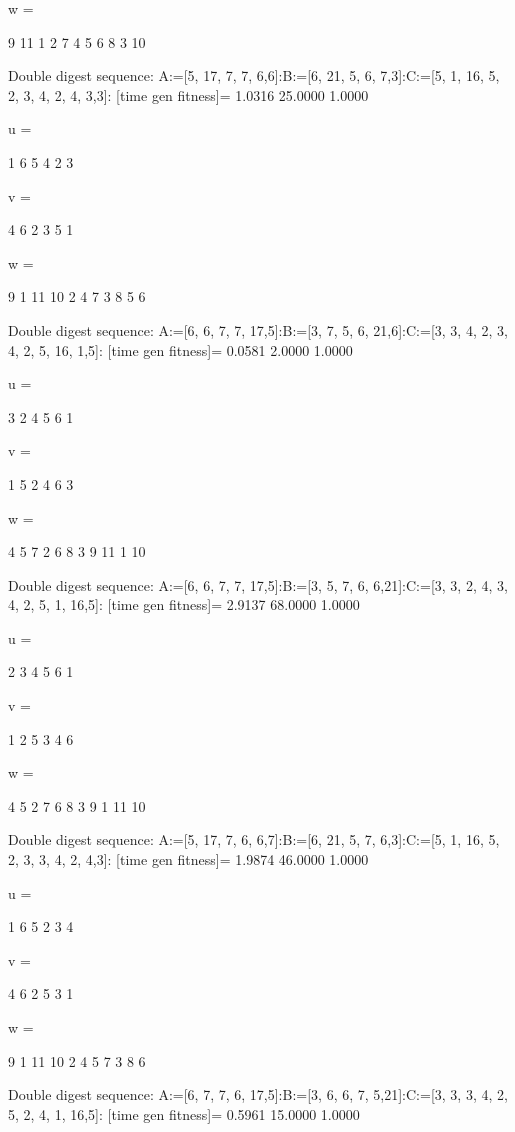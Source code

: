 w =

     9    11     1     2     7     4     5     6     8     3    10

Double digest sequence:
A:=[5, 17, 7, 7, 6,6]:B:=[6, 21, 5, 6, 7,3]:C:=[5, 1, 16, 5, 2, 3, 4, 2, 4, 3,3]:
[time gen fitness]=
    1.0316   25.0000    1.0000


u =

     1     6     5     4     2     3


v =

     4     6     2     3     5     1


w =

     9     1    11    10     2     4     7     3     8     5     6

Double digest sequence:
A:=[6, 6, 7, 7, 17,5]:B:=[3, 7, 5, 6, 21,6]:C:=[3, 3, 4, 2, 3, 4, 2, 5, 16, 1,5]:
[time gen fitness]=
    0.0581    2.0000    1.0000


u =

     3     2     4     5     6     1


v =

     1     5     2     4     6     3


w =

     4     5     7     2     6     8     3     9    11     1    10

Double digest sequence:
A:=[6, 6, 7, 7, 17,5]:B:=[3, 5, 7, 6, 6,21]:C:=[3, 3, 2, 4, 3, 4, 2, 5, 1, 16,5]:
[time gen fitness]=
    2.9137   68.0000    1.0000


u =

     2     3     4     5     6     1


v =

     1     2     5     3     4     6


w =

     4     5     2     7     6     8     3     9     1    11    10

Double digest sequence:
A:=[5, 17, 7, 6, 6,7]:B:=[6, 21, 5, 7, 6,3]:C:=[5, 1, 16, 5, 2, 3, 3, 4, 2, 4,3]:
[time gen fitness]=
    1.9874   46.0000    1.0000


u =

     1     6     5     2     3     4


v =

     4     6     2     5     3     1


w =

     9     1    11    10     2     4     5     7     3     8     6

Double digest sequence:
A:=[6, 7, 7, 6, 17,5]:B:=[3, 6, 6, 7, 5,21]:C:=[3, 3, 3, 4, 2, 5, 2, 4, 1, 16,5]:
[time gen fitness]=
    0.5961   15.0000    1.0000


